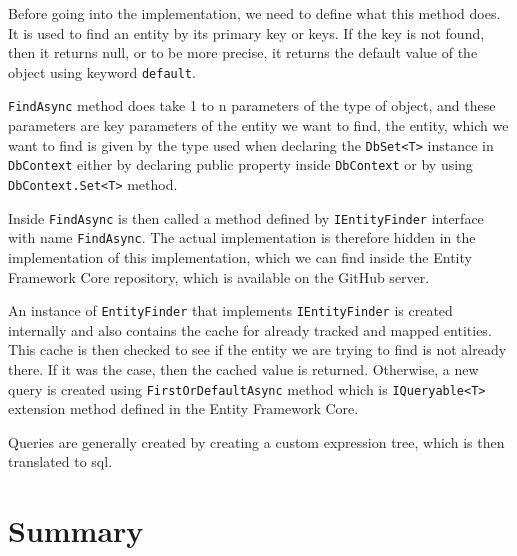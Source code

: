 Before going into the implementation, we need to define what this method does. It is used to find an entity by its primary key or keys.
If the key is not found, then it returns null, or to be more precise, it returns the default value of the object using keyword \texttt{default}.

\texttt{FindAsync} method does take 1 to n parameters of the type of object, and these parameters are key parameters of the entity we want to find, the entity,
which we want to find is given by the type used when declaring the \texttt{DbSet<T>} instance in \texttt{DbContext} either by declaring public property inside \texttt{DbContext}
or by using \texttt{DbContext.Set<T>} method.

Inside \texttt{FindAsync} is then called a method defined by \texttt{IEntityFinder} interface with name \texttt{FindAsync}.
The actual implementation is therefore hidden in the implementation of this implementation, which we can find inside the Entity Framework Core repository, which is available
on the GitHub server.

An instance of \texttt{EntityFinder} that implements \texttt{IEntityFinder} is created internally and also contains the cache for already tracked and mapped entities.
This cache is then checked to see if the entity we are trying to find is not already there. If it was the case, then the cached value is returned. Otherwise, a new query is created
using \texttt{FirstOrDefaultAsync} method which is \texttt{IQueryable<T>} extension method defined in the Entity Framework Core.

Queries are generally created by creating a custom expression tree, which is then translated to \acrshort{sql}.

\section {Summary}


